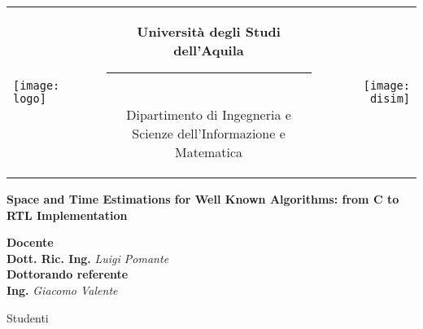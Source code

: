 \begin{titlepage}
\begin{center}
\normalsize

\begin{center}

\begin{tabular}[t]{@{} l @{} c @{} r @{}}
\parbox[c]{0.15\textwidth}{\raggedright \texttt{[image: logo]}}
&
\parbox[c]{0.7\textwidth}
{
\centering \bfseries
Università degli Studi dell'Aquila \\[-5pt]
\rule{0.6\textwidth}{1pt} \\
{\centering \small Dipartimento di Ingegneria e \\Scienze dell'Informazione e Matematica} \\
}
&
\parbox[c]{0.15\textwidth}{\raggedleft \texttt{[image: disim]}}
\end{tabular}
\end{center}

\bigskip \bigskip



\bigskip
\bigskip
\bigskip

\vfil

{\bfseries \huge
Space and Time Estimations for Well Known Algorithms: from C to RTL Implementation \\
}

{\large
\bigskip
\bigskip
\bigskip
\bigskip
{\bfseries \large Docente \\ }
\smallskip
\textbf{Dott. Ric. Ing.} \textit{Luigi Pomante} \\
\bigskip
{\bfseries \large Dottorando referente \\ }
\smallskip
\textbf{Ing.} \textit{Giacomo Valente} \\
}

{\bfseries \large
\bigskip
\bigskip


Studenti \\
}

\vfil
\vfil

\end{center}
\end{titlepage}

